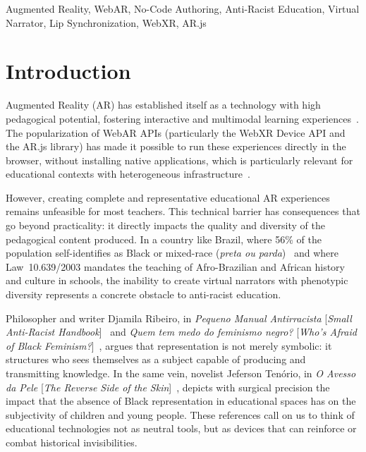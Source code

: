 \documentclass[conference]{IEEEtran}
\begin{document}
\begin{IEEEkeywords}
Augmented Reality, WebAR, No-Code Authoring, Anti-Racist Education, Virtual
Narrator, Lip Synchronization, WebXR, AR.js
\end{IEEEkeywords}

\section{Introduction}

Augmented Reality (AR) has established itself as a technology with high
pedagogical potential, fostering interactive and multimodal learning
experiences~\cite{fonnet2021,munoz2021}. The popularization of WebAR APIs
(particularly the WebXR Device API and the AR.js library) has made it possible
to run these experiences directly in the browser, without installing native
applications, which is particularly relevant for educational contexts with
heterogeneous infrastructure~\cite{koutsabasis2021}.

However, creating complete and representative educational AR experiences
remains unfeasible for most teachers. This technical barrier has consequences
that go beyond practicality: it directly impacts the quality and diversity of
the pedagogical content produced. In a country like Brazil, where 56\% of the
population self-identifies as Black or mixed-race (\textit{preta ou
parda})~\cite{ibge2022} and where Law~10.639/2003 mandates the teaching of
Afro-Brazilian and African history and culture in schools, the inability to
create virtual narrators with phenotypic diversity represents a concrete
obstacle to anti-racist education.

Philosopher and writer Djamila Ribeiro, in \textit{Pequeno Manual
Antirracista} [\textit{Small Anti-Racist Handbook}]~\cite{ribeiro2019} and
\textit{Quem tem medo do feminismo negro?} [\textit{Who's Afraid of Black
Feminism?}]~\cite{ribeiro2018}, argues that representation is not merely
symbolic: it structures who sees themselves as a subject capable of producing
and transmitting knowledge. In the same vein, novelist Jeferson Tenório, in
\textit{O Avesso da Pele} [\textit{The Reverse Side of the Skin}]~\cite{tenorio2020},
depicts with surgical precision the impact that the absence of Black
representation in educational spaces has on the subjectivity of children and
young people. These references call on us to think of educational
technologies not as neutral tools, but as devices that can reinforce or
combat historical invisibilities.
\end{document}
